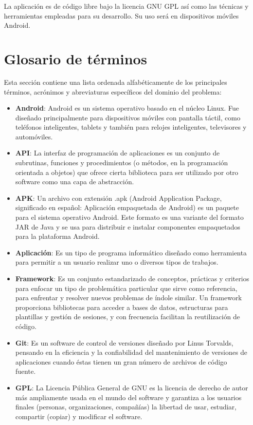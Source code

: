 La aplicación es de código libre bajo la licencia GNU GPL así como las técnicas y herramientas empleadas para su desarrollo. Su uso será en dispositivos móviles Android.

\section{Glosario de términos}

Esta sección contiene una lista ordenada alfabéticamente de los principales términos, acrónimos y abreviaturas específicos del dominio del problema:

\begin{itemize}
\item \textbf{Android}: Android es un sistema operativo basado en el núcleo Linux. Fue diseñado principalmente para dispositivos móviles con pantalla táctil, como teléfonos inteligentes, tablets y también para relojes inteligentes, televisores y automóviles.
\item \textbf{API}: La interfaz de programación de aplicaciones es un conjunto de subrutinas, funciones y procedimientos (o métodos, en la programación orientada a objetos) que ofrece cierta biblioteca para ser utilizado por otro software como una capa de abstracción.
\item \textbf{APK}: Un archivo con extensión .apk (Android Application Package, significado en español: Aplicación empaquetada de Android) es un paquete para el sistema operativo Android. Este formato es una variante del formato JAR de Java y se usa para distribuir e instalar componentes empaquetados para la plataforma Android.
\item \textbf{Aplicación}: Es un tipo de programa informático diseñado como herramienta para permitir a un usuario realizar uno o diversos tipos de trabajos.
\item \textbf{Framework}: Es un conjunto estandarizado de conceptos, prácticas y criterios para enfocar un tipo de problemática particular que sirve como referencia, para enfrentar y resolver nuevos problemas de índole similar. Un framework proporciona bibliotecas para acceder a bases de datos, estructuras para plantillas y gestión de sesiones, y con frecuencia facilitan la reutilización de código.
\item \textbf{Git}: Es un software de control de versiones diseñado por Linus Torvalds, pensando en la eficiencia y la confiabilidad del mantenimiento de versiones de aplicaciones cuando éstas tienen un gran número de archivos de código fuente.
\item \textbf{GPL}: La Licencia Pública General de GNU es la licencia de derecho de autor más ampliamente usada en el mundo del software y garantiza a los usuarios finales (personas, organizaciones, compañías) la libertad de usar, estudiar, compartir (copiar) y modificar el software.

\end{itemize}
